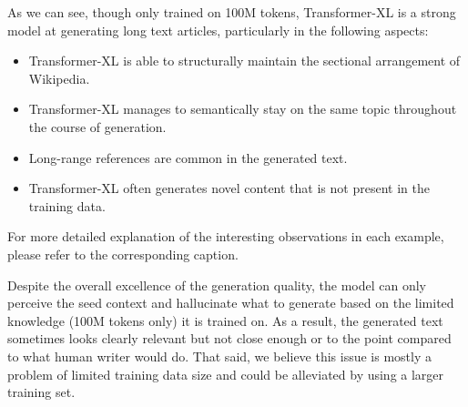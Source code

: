 %
%

As we can see, though only trained on 100M tokens, Transformer-XL is a strong model at generating long text articles, particularly in the following aspects:
\begin{itemize}[topsep=0em,itemsep=0em,parsep=0.2em]
	\item Transformer-XL is able to structurally maintain the sectional arrangement of Wikipedia.
	\item Transformer-XL manages to semantically stay on the same topic throughout the course of generation.
	\item Long-range references are common in the generated text.
	\item Transformer-XL often generates novel content that is not present in the training data.
\end{itemize}
For more detailed explanation of the interesting observations in each example, please refer to the corresponding caption.

Despite the overall excellence of the generation quality, the model can only perceive the seed context and hallucinate what to generate based on the limited knowledge (100M tokens only) it is trained on. As a result, the generated text sometimes looks clearly relevant but not close enough or to the point compared to what human writer would do. 
That said, we believe this issue is mostly a problem of limited training data size and could be alleviated by using a larger training set.

